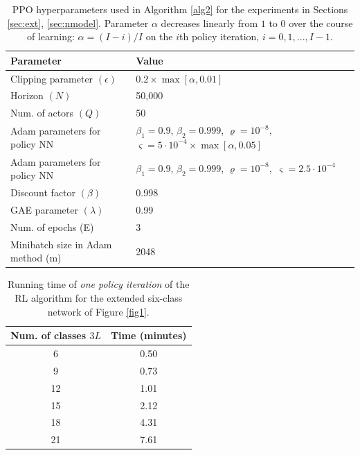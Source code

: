 \documentclass[11pt]{article}
\theoremstyle{definition}
\numberwithin{equation}{section}
\begin{document}
\begin{table}[H]
\centering%
\begin{tabular}{l|@{\quad}l}
  \hline
  Parameter  & Value\\\hline
   Clipping parameter  $(\epsilon)$ & $0.2\times \max[ \alpha,0.01]$ \\
  Horizon $(N)$ & 50,000 \\
  Num. of  actors $(Q)$  & 50 \\
  Adam parameters for policy NN& $\beta_1 = 0.9$, $\beta_2 = 0.999$, $\varrho = 10^{-8},$  $\varsigma=5\cdot 10^{-4}\times \max[ \alpha,0.05]  $   \\
  Adam parameters for policy NN& $\beta_1 = 0.9$, $\beta_2 = 0.999$, $\varrho = 10^{-8},$  $\varsigma=2.5\cdot 10^{-4}  $ \\
  Discount factor $(\beta)$  & 0.998  \\
  GAE parameter $(\lambda)$  & 0.99 \\
  Num. of epochs (E)& 3\\
  Minibatch size in Adam method (m)  & 2048\\
\end{tabular}
\caption[]{PPO hyperparameters used in  Algorithm \ref{alg2} for the experiments in Sections \ref{sec:ext}, \ref{sec:nmodel}. Parameter $\alpha$ decreases linearly  from $1$ to $0$ over the course of learning: $\alpha =(I - i)/I$ on the $i$th policy iteration, $i=0, 1,...,I-1. $}\label{tab:par2}
\end{table}







   \begin{table}[H]
\centering%
\begin{tabular}{|c|c|}
  \hline
  Num. of classes $3L$  & Time (minutes)  \\\hline
  6 & 0.50 \\\hline
  9 & 0.73 \\\hline
  12  & 1.01\\\hline
  15  & 2.12 \\\hline
  18  & 4.31\\\hline
  21  & 7.61 \\
  \hline
\end{tabular}
\caption[]{Running time of \textit{one policy iteration} of the RL algorithm for the extended six-class network of Figure \ref{fig1}.}\label{tab:rt}
\end{table}
\end{document}
